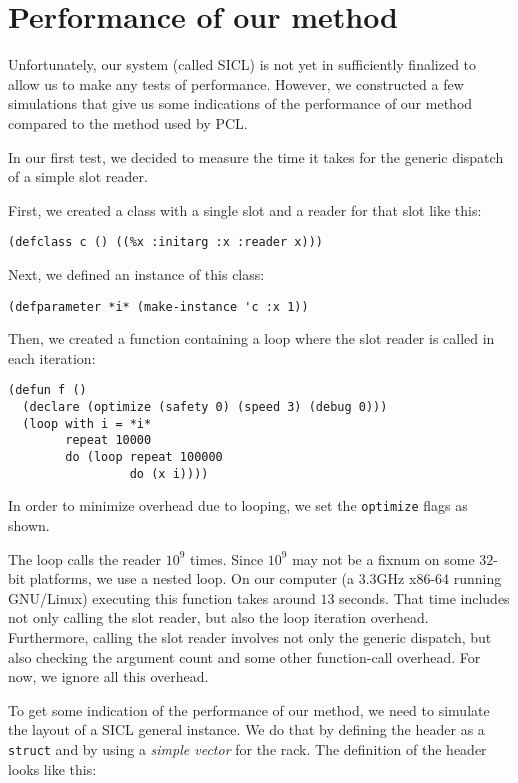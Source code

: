 \section{Performance of our method}

Unfortunately, our system (called SICL) is not yet in sufficiently
finalized to allow us to make any tests of performance.  However, we
constructed a few simulations that give us some indications of the
performance of our method compared to the method used by PCL.

In our first test, we decided to measure the time it takes for the
generic dispatch of a simple slot reader. 

First, we created a class with a single slot and a reader for that
slot like this:

\begin{verbatim}
(defclass c () ((%x :initarg :x :reader x)))  
\end{verbatim}

Next, we defined an instance of this class:

\begin{verbatim}
(defparameter *i* (make-instance 'c :x 1))
\end{verbatim}

Then, we created a function containing a loop where the slot reader is
called in each iteration: 

\begin{verbatim}
(defun f ()
  (declare (optimize (safety 0) (speed 3) (debug 0)))
  (loop with i = *i*
        repeat 10000
        do (loop repeat 100000
                 do (x i))))
\end{verbatim}

In order to minimize overhead due to looping, we set the
\texttt{optimize} flags as shown.

The loop calls the reader $10^9$ times.  Since $10^9$ may not be a
fixnum on some $32$-bit platforms, we use a nested loop.  On our
computer (a 3.3GHz x86-64 running GNU/Linux) executing this function
takes around $13$ seconds.  That time includes not only calling the
slot reader, but also the loop iteration overhead.  Furthermore,
calling the slot reader involves not only the generic dispatch, but
also checking the argument count and some other function-call
overhead.  For now, we ignore all this overhead.

To get some indication of the performance of our method, we need to
simulate the layout of a SICL general instance.  We do that by
defining the header as a \cl{} \texttt{struct} and by using a
\emph{simple vector} for the rack.  The definition of the header looks
like this:

